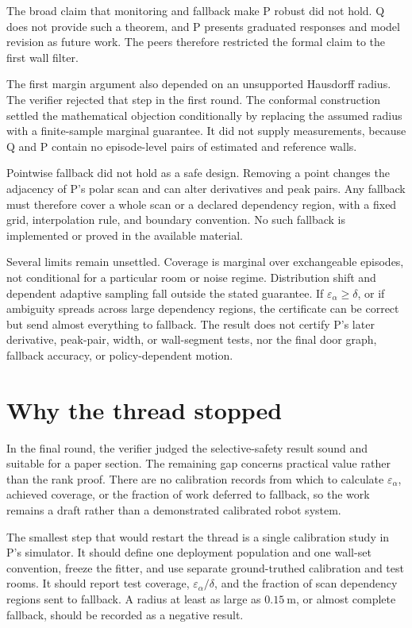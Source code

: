 \documentclass{article}
\begin{document}
The broad claim that monitoring and fallback make P robust did not hold. Q does not provide such a theorem, and P presents graduated responses and model revision as future work. The peers therefore restricted the formal claim to the first wall filter.

The first margin argument also depended on an unsupported Hausdorff radius. The verifier rejected that step in the first round. The conformal construction settled the mathematical objection conditionally by replacing the assumed radius with a finite-sample marginal guarantee. It did not supply measurements, because Q and P contain no episode-level pairs of estimated and reference walls.

Pointwise fallback did not hold as a safe design. Removing a point changes the adjacency of P's polar scan and can alter derivatives and peak pairs. Any fallback must therefore cover a whole scan or a declared dependency region, with a fixed grid, interpolation rule, and boundary convention. No such fallback is implemented or proved in the available material.

Several limits remain unsettled. Coverage is marginal over exchangeable episodes, not conditional for a particular room or noise regime. Distribution shift and dependent adaptive sampling fall outside the stated guarantee. If $\varepsilon_\alpha\geq\delta$, or if ambiguity spreads across large dependency regions, the certificate can be correct but send almost everything to fallback. The result does not certify P's later derivative, peak-pair, width, or wall-segment tests, nor the final door graph, fallback accuracy, or policy-dependent motion.

\section{Why the thread stopped}

In the final round, the verifier judged the selective-safety result sound and suitable for a paper section. The remaining gap concerns practical value rather than the rank proof. There are no calibration records from which to calculate $\varepsilon_\alpha$, achieved coverage, or the fraction of work deferred to fallback, so the work remains a draft rather than a demonstrated calibrated robot system.

The smallest step that would restart the thread is a single calibration study in P's simulator. It should define one deployment population and one wall-set convention, freeze the fitter, and use separate ground-truthed calibration and test rooms. It should report test coverage, $\varepsilon_\alpha/\delta$, and the fraction of scan dependency regions sent to fallback. A radius at least as large as $0.15\ \mathrm{m}$, or almost complete fallback, should be recorded as a negative result.



\end{document}
